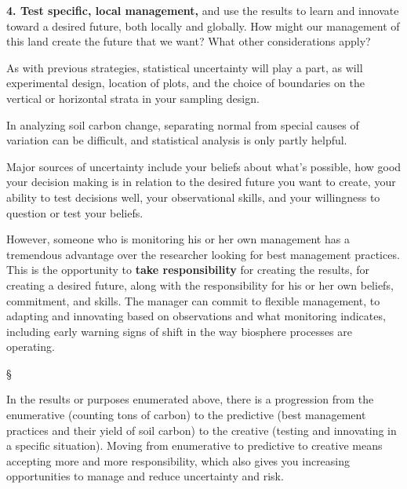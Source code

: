 \documentclass[11pt,letterpaper,oneside,onecolumn]{memoir}
\begin{document}
\textbf{4. Test specific, local management,} and use the results to learn and innovate toward a desired future, both locally and globally. How might our management of this land create the future that we want? What other considerations apply?

As with previous strategies, statistical uncertainty will play a part, as will experimental design, location of plots, and the choice of boundaries on the vertical or horizontal strata in your sampling design.

In analyzing soil carbon change, separating normal from special causes of variation can be difficult, and statistical analysis is only partly helpful.

Major sources of uncertainty include your beliefs about what's possible, how good your decision making is in relation to the desired future you want to create, your ability to test decisions well, your observational skills, and your willingness to question or test your beliefs.

However, someone who is monitoring his or her own management has a tremendous advantage over the researcher looking for best management practices. This is the opportunity to \textbf{take responsibility} for creating the results, for creating a desired future, along with the responsibility for his or her own beliefs, commitment, and skills. The manager can commit to flexible management, to adapting and innovating based on observations and what monitoring indicates, including early warning signs of shift in the way biosphere processes are operating.

\begin{center}
\S
\end{center}

\noindent In the results or purposes enumerated above, there is a progression from the enumerative (counting tons of carbon) to the predictive (best management practices and their yield of soil carbon) to the creative (testing and innovating in a specific situation). Moving from enumerative to predictive to creative means accepting more and more responsibility, which also gives you increasing opportunities to manage and reduce uncertainty and risk.
\end{document}
